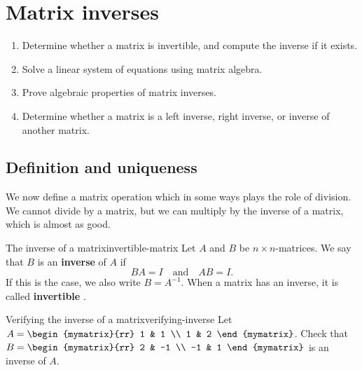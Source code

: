 \section{Matrix inverses}

\begin{outcome}
  \begin{enumerate}
  \item Determine whether a matrix is invertible, and compute the
    inverse if it exists.
  \item Solve a linear system of equations using matrix algebra.
  \item Prove algebraic properties of matrix inverses.
  \item Determine whether a matrix is a left inverse, right inverse, or
    inverse of another matrix.
  \end{enumerate}
\end{outcome}

\subsection{Definition and uniqueness}

We now define a matrix operation which in some ways plays the role
of division. We cannot divide by a matrix, but we can multiply by the
inverse of a matrix, which is almost as good.

\begin{definition}{The inverse of a matrix}{invertible-matrix}
  Let $A$ and $B$ be $n\times n$-matrices. We say that $B$ is an
  \textbf{inverse}%
   of $A$ if
  \begin{equation*}
    BA=I\quad\mbox{and}\quad
    AB=I.
  \end{equation*}
  If this is the case, we also write $B=A^{-1}$. When a matrix has an
  inverse, it is called \textbf{invertible}%
  .
\end{definition}

\begin{example}{Verifying the inverse of a matrix}{verifying-inverse}
  Let $A=\begin{mymatrix}{rr}
    1 & 1 \\
    1 & 2
  \end{mymatrix}$. Check that $B=\begin{mymatrix}{rr}
    2 & -1 \\
    -1 & 1
  \end{mymatrix}$ is an inverse of $A$.
\end{example}

